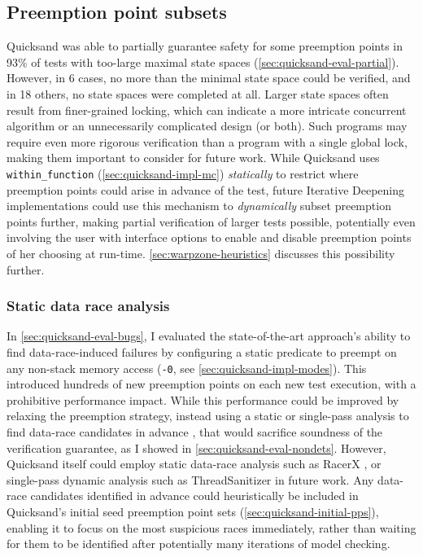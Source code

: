 \subsection{Preemption point subsets}
\label{sec:quicksand-discussion-subsets}

Quicksand was able to partially guarantee safety for some preemption points
in 93\% of tests with too-large maximal state spaces (\cref{sec:quicksand-eval-partial}).
However, in 6 cases, no more than the minimal state space could be verified,
and in 18 others, no state spaces were completed at all.
Larger state spaces often result from finer-grained locking,
which can indicate a more intricate concurrent algorithm or an unnecessarily complicated design (or both).
Such programs may require even more rigorous verification than a program with a single global lock,
making them important to consider for future work.
While Quicksand uses {\tt within\_function} (\cref{sec:quicksand-impl-mc})
{\em statically} to restrict where preemption points could arise in advance of the test,
future
Iterative Deepening
implementations could use this mechanism to {\em dynamically} subset preemption points further,
making partial verification of larger tests possible,
potentially even involving the user with interface options
to enable and disable preemption points of her choosing at run-time.
\cref{sec:warpzone-heuristics} discusses this possibility further.

\subsubsection{Static data race analysis}

In \cref{sec:quicksand-eval-bugs}, I evaluated the state-of-the-art approach's ability to find data-race-induced failures
by configuring a static predicate to preempt on any non-stack memory access
({\tt -0}, see \cref{sec:quicksand-impl-modes}).
This introduced hundreds of new preemption points on each new test execution,
with a prohibitive performance impact.
While this performance could be improved by
relaxing the preemption strategy,
instead using a static or single-pass analysis to find data-race candidates in advance \cite{portend},
that would sacrifice soundness of the verification guarantee, as I showed in \cref{sec:quicksand-eval-nondets}.
However, Quicksand itself could employ static data-race analysis such as RacerX \cite{racerx},
or single-pass dynamic analysis such as ThreadSanitizer \cite{tsan} in future work.
Any data-race candidates identified in advance could heuristically be included in Quicksand's initial seed preemption point sets
(\cref{sec:quicksand-initial-pps}),
enabling it to focus on the most suspicious races immediately,
rather than waiting for them to be identified after potentially many iterations of model checking.

